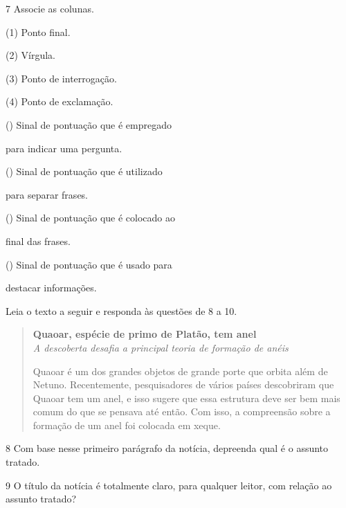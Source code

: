 \num{7} Associe as colunas.

\begin{multicols}{2}
(1) Ponto final.\medskip

(2) Vírgula.\medskip

(3) Ponto de interrogação.\medskip

(4) Ponto de exclamação.

\columnbreak

({}) Sinal de pontuação que é empregado

para indicar uma pergunta.\medskip

({}) Sinal de pontuação que é utilizado

para separar frases.\medskip

({}) Sinal de pontuação que é colocado ao

final das frases.\medskip

({}) Sinal de pontuação que é usado para

destacar informações.
\end{multicols}

\bigskip
Leia o texto a seguir e responda às questões de 8 a 10.

\begin{quote}
\textbf{Quaoar, espécie de primo de Platão, tem anel}\\
\textit{A descoberta desafia a principal teoria de formação de anéis}

Quaoar é um dos grandes objetos de grande porte que orbita além de Netuno.
Recentemente, pesquisadores de vários países descobriram que Quaoar tem um
anel, e isso sugere que essa estrutura deve ser bem mais comum do que se
pensava até então. Com isso, a compreensão sobre a formação de um anel
foi colocada em xeque.

\end{quote}

\num{8} Com base nesse primeiro parágrafo da notícia, depreenda qual é o assunto tratado.



\num{9} O título da notícia é totalmente claro, para qualquer leitor, com relação ao assunto tratado?

